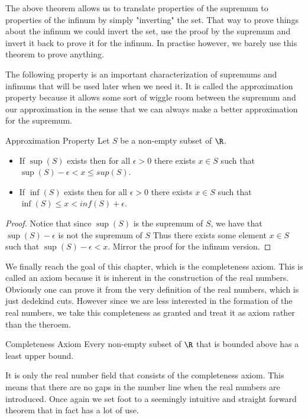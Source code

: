 The above theorem allows us to translate properties of the supremum to properties of the infinum by simply "inverting" the set. That way to prove things about the infinum we could invert the set, use the proof by the supremum and invert it back to prove it for the infinum. In practise however, we barely use this theorem to prove anything. 

The following property is an important characterization of supremums and infinums that will be used later when we need it. It is called the approximation property because it allows some sort of wiggle room between the supremum and our approximation in the sense that we can always make a better approximation for the supremum. 

\begin{thm}{Approximation Property}{} Let $S$ be a non-empty subset of $\R$. 
\begin{itemize}
\item If $\sup(S)$ exists then for all $\epsilon>0$ there exists $x\in S$ such that $\sup(S)-\epsilon<x\leq sup(S)$. 
\item If $\inf(S)$ exists then for all $\epsilon>0$ there exists $x\in S$ such that $\inf(S)\leq x<inf(S)+\epsilon$. 
\end{itemize}\tcbline
\begin{proof} Notice that since $\sup(S)$ is the supremum of $S$, we have that $\sup(S)-\epsilon$ is not the supremum of $S$ Thus there exists some element $x\in S$ such that $\sup(S)-\epsilon<x$. Mirror the proof for the infinum version. 
\end{proof}
\end{thm}

We finally reach the goal of this chapter, which is the completeness axiom. This is called an axiom because it is inherent in the construction of the real numbers. Obviously one can prove it from the very definition of the real numbers, which is just dedekind cuts. However since we are less interested in the formation of the real numbers, we take this completeness as granted and treat it as axiom rather than the theroem. 

\begin{axm}{Completeness Axiom}{} Every non-empty subset of $\R$ that is bounded above has a least upper bound. 
\end{axm}

It is only the real number field that consists of the completeness axiom. This means that there are no gaps in the number line when the real numbers are introduced. Once again we set foot to a seemingly intuitive and straight forward theorem that in fact has a lot of use. 

